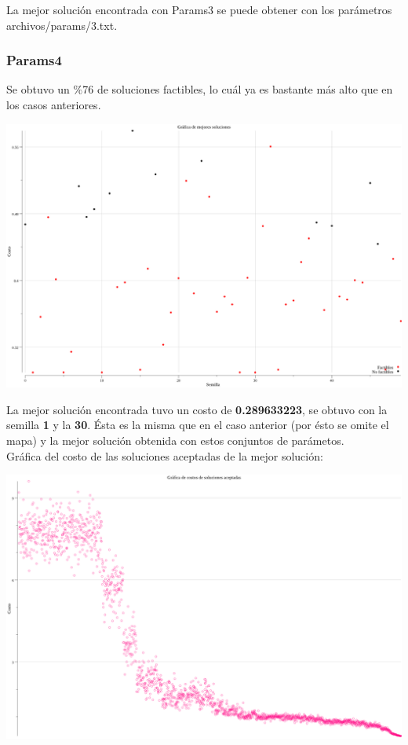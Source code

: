\documentclass[12pt]{article}
\begin{document}
La mejor solución encontrada con Params3 se puede obtener con los parámetros \textsf{archivos/params/3.txt}.

\newpage

\subsubsection*{Params4}

Se obtuvo un $\%$76 de soluciones factibles, lo cuál ya es bastante más alto que en los casos anteriores. \\

\begin{center}
  \includegraphics[scale=0.25]{../archivos/graficas/mejores-soluciones/soluciones4.png} \\
\end{center}
  
La mejor solución encontrada tuvo un costo de \textbf{0.289633223}, se obtuvo con la semilla \textbf{1} y la \textbf{30}. Ésta es la misma que en el caso anterior (por ésto se omite el mapa) y la mejor solución obtenida con estos conjuntos de parámetos. \\
Gráfica del costo de las soluciones aceptadas de la mejor solución: \\

\begin{center}
\includegraphics[scale=0.25]{../archivos/graficas/soluciones-aceptadas/costos4.png} \\
\end{center}
\end{document}
